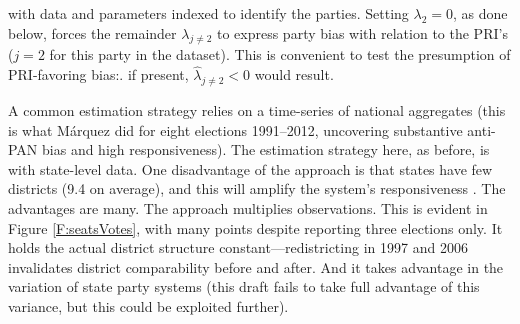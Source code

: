 \documentclass[letter,12pt]{article}
\begin{document}
\noindent with data and parameters indexed to identify the parties. \citep[Another, with application to Argentine federalism, is][.]{calvo.micozzi.govReform.2005} Setting $\lambda_2 = 0$, as done below, forces the remainder $\lambda_{j \neq 2}$ to express party bias with relation to the PRI's ($j=2$ for this party in the dataset). This is convenient to test the presumption of PRI-favoring bias:. if present, $\hat{\lambda}_{j \neq 2}<0$ would result.

A common estimation strategy relies on a time-series of national aggregates (this is what M\'arquez did for eight elections 1991--2012, uncovering substantive anti-PAN bias and high responsiveness). The estimation strategy here, as before, is with state-level data. One disadvantage of the approach is that states have few districts (9.4 on average), and this will amplify the system's responsiveness \citep{taagepera.CubeLaw.1973}. The advantages are many. The approach multiplies observations. This is evident in Figure \ref{F:seatsVotes}, with many points despite reporting three elections only. It holds the actual district structure constant---redistricting in 1997 and 2006 invalidates district comparability before and after. And it takes advantage in the variation of state party systems (this draft fails to take full advantage of this variance, but this could be exploited further). 
\end{document}
